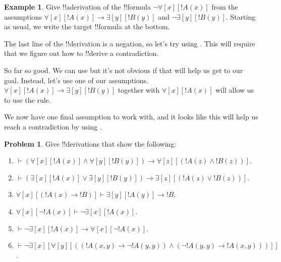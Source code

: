 \documentclass[10pt,a4paper]{article}
\theoremstyle{plain}
\theoremstyle{definition}
\newtheorem{ex}[thm]{Example}
\newtheorem{prob}{Problem}[section]
\theoremstyle{remark}
\providecommand{\AxiomC}[1]{}
\providecommand{\UnaryInfC}[1]{}
\providecommand{\BinaryInfC}[1]{}
\providecommand{\RightLabel}[1]{}
\newenvironment{prooftree}{}{}
\providecommand{\lif}{\mathbin{\rightarrow}}
\providecommand{\lforall}{\mathord{\forall}}
\providecommand{\lexists}{\mathord{\exists}}
\providecommand{\lfalse}{\bot}
\providecommand{\Proves}{\mathrel{\vdash}}
\providecommand{\Elim}[1]{}
\providecommand{\Intro}[1]{}
\providecommand{\Discharge}{\mathrm{Dis}}
\providecommand{\Intro}{\mathrm{I}}
\begin{document}
\begin{ex}
Give !!a{derivation} of the !!{formula}
$\lnot\lforall[x][!A(x)]$ from the assumptions $\lforall[x][!A(x)] 
\lif \lexists[y][!B(y)]$ and $\lnot\lexists[y][!B(y)]$.
Starting as usual, we write the target !!{formula} at the bottom.
\begin{prooftree}
\AxiomC{}
\UnaryInfC{$\lnot\lforall[x][!A(x)]$}
\end{prooftree}
The last line of the !!{derivation} is a negation, so let's try using
\Intro{\lnot}. This will require that we figure out how to !!{derive}
a contradiction.
\begin{prooftree}
\AxiomC{$\Discharge{\lforall[x][!A(x)]}{1}$}
\DeduceC{$\lfalse$}
\DischargeRule{\Intro{\lnot}}{1}
\UnaryInfC{$\lnot\lforall[x][!A(x)]$}
\end{prooftree}
So far so good. We can use \Elim{\lforall} but it's not obvious
if that will help us get to our goal. Instead, let's use one of our 
assumptions. $\lforall[x][!A(x)] \lif \lexists[y][!B(y)]$ together
with $\lforall[x][!A(x)]$ will allow us to use the \Elim{\lif} rule.
\begin{prooftree}
\AxiomC{$\lforall[x][!A(x)] \lif \lexists[y][!B(y)]$}
\AxiomC{$\Discharge{\lforall[x][!A(x)]}{1}$}
\RightLabel{\Elim{\lif}}
\BinaryInfC{$\lexists[y][!B(y)]$}
\DeduceC{$\lfalse$}
\DischargeRule{\Intro{\lnot}}{1}
\UnaryInfC{$\lnot\lforall[x][!A(x)]$}
\end{prooftree}
We now have one final assumption to work with,
and it looks like this will help us reach a contradiction
by using \Elim{\lnot}.
\begin{prooftree}
\AxiomC{$\lnot\lexists[y][!B(y)]$}
\AxiomC{$\lforall[x][!A(x)] \lif \lexists[y][!B(y)]$}
\AxiomC{$\Discharge{\lforall[x][!A(x)]}{1}$}
\RightLabel{\Elim{\lif}}
\BinaryInfC{$\lexists[y][!B(y)]$}
\RightLabel{\Elim{\lnot}}
\BinaryInfC{$\lfalse$}
\DischargeRule{\Intro{\lnot}}{1}
\UnaryInfC{$\lnot\lforall[x][!A(x)]$}
\end{prooftree}
\end{ex}

\begin{prob}
Give !!{derivation}s that show the following:
\begin{enumerate}
\item $\Proves (\lforall[x][!A(x)] \land \lforall[y][!B(y)]) \lif
\lforall[z][(!A(z) \land !B(z))]$.
\item $\Proves (\lexists[x][!A(x)] \lor \lexists[y][!B(y)]) \lif
\lexists[z][(!A(z) \lor !B(z))]$.
\item $\lforall[x][(!A(x) \lif !B)] \Proves \lexists[y][!A(y)] \lif !B$.
\item $\lforall[x][\lnot !A(x)] \Proves \lnot\lexists[x][!A(x)]$.
\item $\Proves \lnot\lexists[x][!A(x)] \lif \lforall[x][\lnot !A(x)]$.
\item $\Proves \lnot\lexists[x][\lforall[y][((!A(x,y) \lif \lnot
!A(y,y)) \land (\lnot !A(y,y) \lif !A(x,y)))]]$.
\end{enumerate}
\end{prob}
\end{document}
